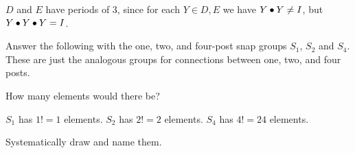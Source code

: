 \documentclass[../gatm_answers.tex]{subfiles}
\begin{document}
\noindent $D$ and $E$ have periods of $3$, since for each $Y\in {D,E}$ we have $Y\bullet Y\neq I$, but $Y\bullet Y\bullet Y=I$.

\begin{outer_problem}
\item Answer the following with the one, two, and four-post snap groups $S_1$, $S_2$ and $S_4$. These are just the analogous groups for connections between one, two, and four posts.
\end{outer_problem}

\begin{inner_problem}[start=1]
	\item How many elements would there be?
\end{inner_problem}

\noindent $S_1$ has $1!=1$ elements. $S_2$ has $2!=2$ elements. $S_4$ has $4!=24$ elements.

\begin{inner_problem}
	\item Systematically draw and name them.
\end{inner_problem}
\end{document}
